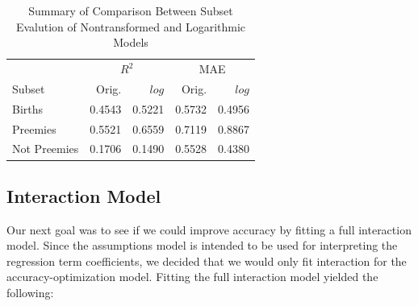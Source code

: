 \documentclass{article}\usepackage[]{graphicx}\usepackage[]{xcolor}
\begin{document}
\begin{table}[ht]
\centering
\begin{tabular}{lrrrr}
  \hline
  &  \multicolumn{2}{c}{$R^2$} & \multicolumn{2}{c}{MAE}\\
  Subset & Orig. & $log$ & Orig. & $log$\\ 
  \hline
   Births & 0.4543 & 0.5221 & 0.5732 & 0.4956 \\ 
   Preemies & 0.5521 &  0.6559 & 0.7119 &  0.8867 \\ 
   Not Preemies & 0.1706 & 0.1490 & 0.5528& 0.4380 \\
   \hline
\end{tabular}
\caption{Summary of Comparison Between Subset Evalution of Nontransformed and Logarithmic Models}
\label{subset.comp}
\end{table}

\subsection{Interaction Model}

Our next goal was to see if we could improve accuracy by fitting a full interaction model. Since the assumptions model is intended to be used for interpreting the regression term coefficients, we decided that we would only fit interaction for the accuracy-optimization model. Fitting the full interaction model yielded the following: 
\end{document}

